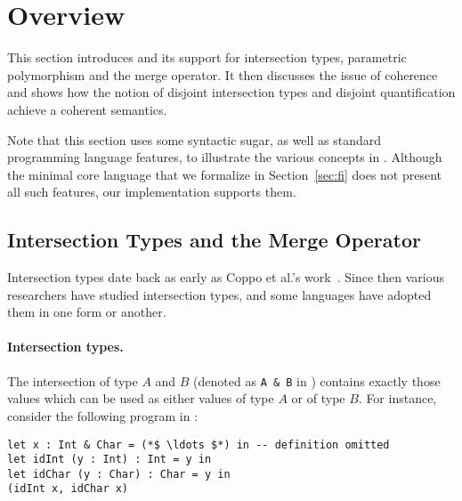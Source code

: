 \section{Overview} \label{sec:overview}

This section introduces \name and its support for intersection types,
parametric polymorphism and the merge operator. 
It then discusses the issue of coherence and shows how the notion of disjoint
intersection types and disjoint quantification achieve a coherent semantics.

Note that this section uses some syntactic sugar, as well as standard
programming language features, to illustrate the various concepts in \name. 
Although the minimal core language that we formalize in
Section~\ref{sec:fi} does not present all such features, our implementation
supports them.

\subsection{Intersection Types and the Merge Operator}

Intersection types date back as early as Coppo et
al.'s work~\cite{coppo1981functional}. Since then various researchers have
studied intersection types, and some languages have adopted them in one
form or another.

\paragraph{Intersection types.}
The intersection of type $A$ and $B$ (denoted as \lstinline{A & B} in
\name) contains exactly those values
which can be used as either values of type $A$ or of type $B$. For instance,
consider the following program in \namedis:

\begin{lstlisting}
let x : Int & Char = (*$ \ldots $*) in -- definition omitted
let idInt (y : Int) : Int = y in
let idChar (y : Char) : Char = y in
(idInt x, idChar x)
\end{lstlisting}

